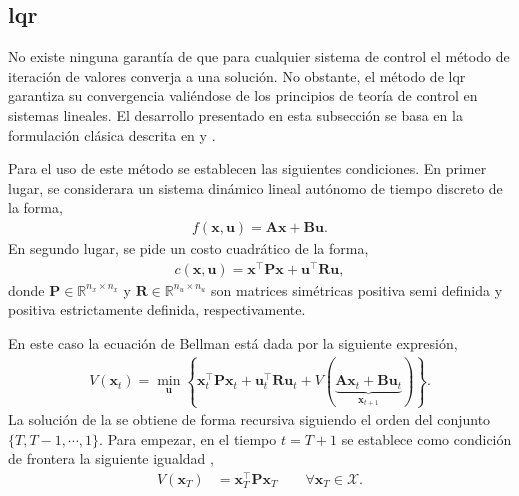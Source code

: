 \subsection{\acrlong{lqr}}
No existe ninguna garantía de que para cualquier sistema de control el método de iteración de valores converja a una solución. No obstante, el método de \acrshort{lqr} garantiza su convergencia valiéndose de los principios de teoría de control en sistemas lineales.
El desarrollo presentado en esta subsección se basa en la formulación clásica descrita en \cite{Bertsekas1995a} y \cite{underactuated}.

Para el uso de este método se establecen las siguientes condiciones. En primer lugar, se considerara un sistema dinámico lineal autónomo de tiempo discreto de la forma,
\begin{align}
    f(\mathbf{x}, \mathbf{u}) = \mathbf{A}\mathbf{x}+ \mathbf{B}\mathbf{u}.
\end{align}
En segundo lugar, se pide un costo cuadrático de la forma,
\begin{align}
c(\mathbf{x}, \mathbf{u}) = \mathbf{x}^{\top}\mathbf{P}\mathbf{x} + \mathbf{u}^{\top}\mathbf{R}\mathbf{u},
\end{align}
donde $\mathbf{P} \in \mathbb{R}^{n_x\times n_x}$ y $\mathbf{R} \in \mathbb{R}^{n_u\times n_u}$ son matrices simétricas positiva semi definida y positiva estrictamente definida, respectivamente. \cite{underactuated}

En este caso la ecuación de Bellman está dada por la siguiente expresión,
\begin{align}
V(\mathbf{x}_{t}) = \min_{
\mathbf{u}}
\left\{    \mathbf{x}_{t}^{\top}\mathbf{P}\mathbf{x}_{t} + \mathbf{u}_{t}^{\top}\mathbf{R}\mathbf{u}_{t} + 
    V(\underbrace{\mathbf{A}\mathbf{x}_{t}+ \mathbf{B}\mathbf{u}_{t}}_{\mathbf{x}_{t+1}})
    \right\}.
    \label{eq:LQR_Bellman}
\end{align}
La solución de la  se obtiene de forma recursiva siguiendo el orden del conjunto $\{T, T-1, \cdots, 1\}$. Para empezar, en el tiempo $t=T+1$ se establece como condición de frontera la siguiente igualdad \cite{underactuated},
\begin{align}
    V(\mathbf{x}_{T}) &= \mathbf{x}_{T}^{\top}\mathbf{P}\mathbf{x}_{T} \qquad \forall \mathbf{x}_{T}\in\mathcal{X}.
    \label{eq:frontier_cond}
\end{align}

